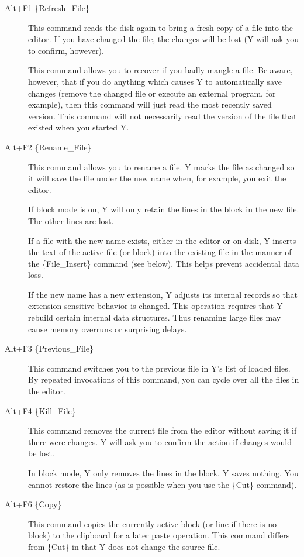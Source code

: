 \begin{description}

\item[Alt+F1 \{Refresh\_File\}] This command reads the disk again to bring a fresh copy of a
  file into the editor. If you have changed the file, the changes will be lost (Y will ask you
  to confirm, however).

  This command allows you to recover if you badly mangle a file. Be aware, however, that if you
  do anything which causes Y to automatically save changes (remove the changed file or execute
  an external program, for example), then this command will just read the most recently saved
  version. This command will not necessarily read the version of the file that existed when you
  started Y.

\item[Alt+F2 \{Rename\_File\}] This command allows you to rename a file. Y marks the file as
  changed so it will save the file under the new name when, for example, you exit the editor.

  If block mode is on, Y will only retain the lines in the block in the new file. The other
  lines are lost.

  If a file with the new name exists, either in the editor or on disk, Y inserts the text of the
  active file (or block) into the existing file in the manner of the \{File\_Insert\} command
  (see below). This helps prevent accidental data loss.

  If the new name has a new extension, Y adjusts its internal records so that extension
  sensitive behavior is changed. This operation requires that Y rebuild certain internal data
  structures. Thus renaming large files may cause memory overruns or surprising delays.

\item[Alt+F3 \{Previous\_File\}] This command switches you to the previous file in Y's list of
  loaded files. By repeated invocations of this command, you can cycle over all the files in the
  editor.

\item[Alt+F4 \{Kill\_File\}] This command removes the current file from the editor without
  saving it if there were changes. Y will ask you to confirm the action if changes would be
  lost.

  In block mode, Y only removes the lines in the block. Y saves nothing. You cannot restore the
  lines (as is possible when you use the \{Cut\} command).

\item[Alt+F6 \{Copy\}] This command copies the currently active block (or line if there is no
  block) to the clipboard for a later paste operation. This command differs from \{Cut\} in that
  Y does not change the source file.


\end{description}
